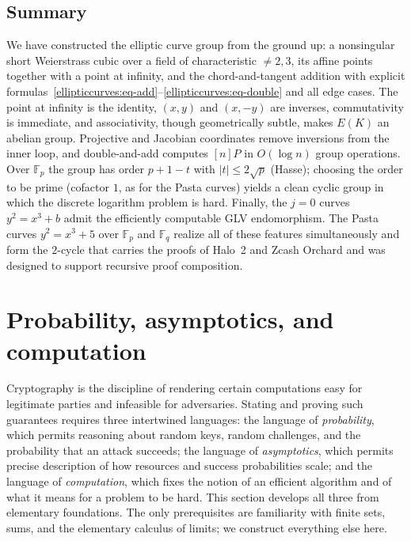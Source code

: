 \documentclass[11pt,a4paper]{article}
\theoremstyle{definition}
\theoremstyle{remark}
\newcommand{\Fp}{\ensuremath{\mathbb{F}_{p}}}
\newcommand{\Fq}{\ensuremath{\mathbb{F}_{q}}}
\begin{document}
\subsection{Summary}

We have constructed the elliptic curve group from the ground up: a nonsingular short Weierstrass cubic over a field of characteristic \(\neq 2,3\), its affine points together with a point at infinity, and the chord-and-tangent addition with explicit formulas~\eqref{ellipticcurves:eq-add}--\eqref{ellipticcurves:eq-double} and all edge cases. The point at infinity is the identity, \((x,y)\) and \((x,-y)\) are inverses, commutativity is immediate, and associativity, though geometrically subtle, makes \(E(K)\) an abelian group. Projective and Jacobian coordinates remove inversions from the inner loop, and double-and-add computes \([n]P\) in \(O(\log n)\) group operations. Over \(\Fp\) the group has order \(p + 1 - t\) with \(|t| \le 2\sqrt p\) (Hasse); choosing the order to be prime (cofactor \(1\), as for the Pasta curves) yields a clean cyclic group in which the discrete logarithm problem is hard. Finally, the \(j = 0\) curves \(y^2 = x^3 + b\) admit the efficiently computable GLV endomorphism. The Pasta curves \(y^2 = x^3 + 5\) over \(\Fp\) and \(\Fq\) realize all of these features simultaneously and form the \(2\)-cycle that carries the proofs of Halo~2 and Zcash Orchard and was designed to support recursive proof composition.

\clearpage

\section{Probability, asymptotics, and computation}\label{sec:probability}

Cryptography is the discipline of rendering certain computations easy for legitimate parties and infeasible for adversaries. Stating and proving such guarantees requires three intertwined languages: the language of \emph{probability}, which permits reasoning about random keys, random challenges, and the probability that an attack succeeds; the language of \emph{asymptotics}, which permits precise description of how resources and success probabilities scale; and the language of \emph{computation}, which fixes the notion of an efficient algorithm and of what it means for a problem to be hard. This section develops all three from elementary foundations. The only prerequisites are familiarity with finite sets, sums, and the elementary calculus of limits; we construct everything else here.
\end{document}
